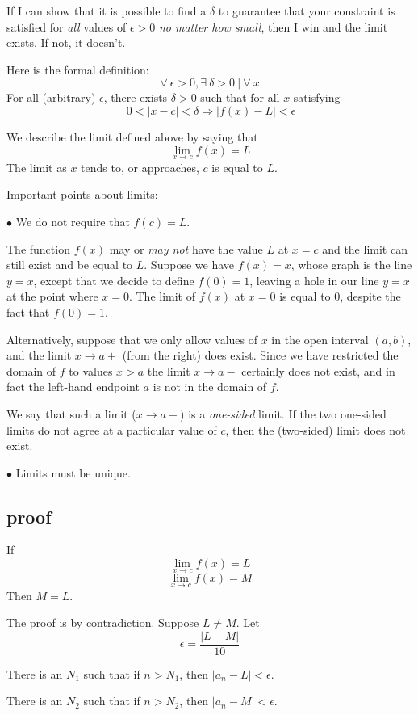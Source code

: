 \documentclass[11pt, oneside]{article}
\begin{document}
If I can show that it is possible to find a $\delta$ to guarantee that your constraint is satisfied for \emph{all} values of $\epsilon > 0$ \emph{no matter how small}, then I win and the limit exists.  If not, it doesn't.

Here is the formal definition:
\[ \forall \ \epsilon > 0, \exists \ \delta > 0 \ | \ \forall \ x \]
For all (arbitrary) $\epsilon$, there exists $\delta > 0$ such that for all $x$ satisfying
\[ \ 0 < | x - c| < \delta \Rightarrow | f(x) - L | < \epsilon \]

We describe the limit defined above by saying that
\[ \lim_{x \rightarrow c} f(x) = L \]
The limit as $x$ tends to, or approaches, $c$ is equal to $L$.

Important points about limits:

$\bullet$  We do not require that $f(c) = L$.

The function $f(x)$ may or \emph{may not} have the value $L$ at $x=c$ and the limit can still exist and be equal to $L$.  Suppose we have $f(x) = x$, whose graph is the line $y=x$, except that we decide to define $f(0) = 1$, leaving a hole in our line $y=x$ at the point where $x=0$.  The limit of $f(x)$ at $x=0$ is equal to $0$, despite the fact that $f(0) = 1$.

Alternatively, suppose that we only allow values of $x$ in the open interval $(a,b)$, and the limit $x \rightarrow a +$ (from the right) does exist.  Since we have restricted the domain of $f$ to values $x > a$ the limit $x \rightarrow a -$ certainly does not exist, and in fact the left-hand endpoint $a$ is not in the domain of $f$.

We say that such a limit ($x \rightarrow a +$) is a \emph{one-sided} limit.  If the two one-sided limits do not agree at a particular value of $c$, then the (two-sided) limit does not exist.

$\bullet$  Limits must be unique.

\subsection*{proof}
If
\[ \lim_{x \rightarrow c} f(x) = L \]
\[ \lim_{x \rightarrow c} f(x) = M \]
Then $M = L$.

The proof is by contradiction.  Suppose $L \ne M$.  Let
\[ \epsilon = \frac{|L - M|}{10} \]

There is an $N_1$ such that if $n > N_1$, then $|a_n - L| < \epsilon$.

There is an $N_2$ such that if $n > N_2$, then $|a_n - M| < \epsilon$.
\end{document}

